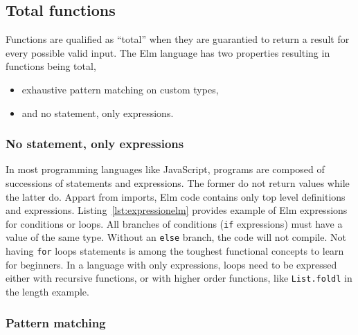 




\subsection{Total functions}%
\label{sub:total_functions}

Functions are qualified as ``total'' when they are guarantied
to return a result for every possible valid input.
The Elm language has two properties resulting in functions being total,
\begin{itemize}
	\item exhaustive pattern matching on custom types,
	\item and no statement, only expressions.
\end{itemize}

\subsubsection{No statement, only expressions}%
\label{ssub:no_statement_only_expressions}

In most programming languages like JavaScript,
programs are composed of successions of statements and expressions.
The former do not return values while the latter do.
Appart from imports, Elm code contains only top level definitions and expressions.
Listing~\ref{lst:expressionelm} provides example of Elm expressions
for conditions or loops.
All branches of conditions (\verb|if| expressions) must have a value of the same type.
Without an \verb|else|  branch, the code will not compile.
Not having \verb|for| loops statements is among the toughest functional
concepts to learn for beginners.
In a language with only expressions,
loops need to be expressed either with recursive functions,
or with higher order functions, like \verb|List.foldl| in the length example.




\subsubsection{Pattern matching}%
\label{ssub:pattern_matching}

